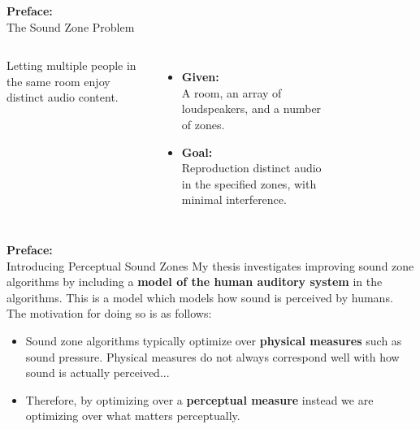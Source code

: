 \documentclass[aspectratio=169]{beamer}
\begin{document}
\begin{frame}{\textbf{Preface:}\\ The Sound Zone Problem}
    \begin{columns}[c]
        Letting multiple people in the same room enjoy distinct audio content.
        \begin{itemize}
            \item \textbf{Given:}\\ A room, an array of loudspeakers, and a number of zones.
            \item \textbf{Goal:}\\  Reproduction distinct audio in the specified zones, with minimal interference.
        \end{itemize}
        \begin{figure}[]
            \centering
            \scalebox{0.7}{}
        \end{figure}
    \end{columns}
\end{frame}

\begin{frame}{\textbf{Preface:}\\ Introducing Perceptual Sound Zones}
    My thesis investigates improving sound zone algorithms by including a \textbf{model of the human auditory system} in the algorithms.
    This is a model which models how sound is perceived by humans.\\
    \vspace{10pt}
    The motivation for doing so is as follows:
    \begin{itemize}
        \item Sound zone algorithms typically optimize over \textbf{physical measures} such as sound pressure.
            Physical measures do not always correspond well with how sound is actually perceived...
        \item Therefore, by optimizing over a \textbf{perceptual measure} instead we are optimizing over what matters perceptually.
    \end{itemize}
\end{frame}

\end{document}
